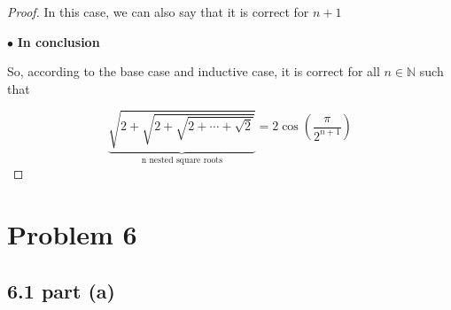 \documentclass[12pt]{article}
\begin{document}
\begin{proof}
    \vspace*{0.3cm}
    \hspace*{1.2cm}
    In this case, we can also say that it is correct for $n+1$

    \vspace*{0.3cm}
    $\bullet$ \textbf{In conclusion}

    \vspace*{0.3cm}
    \hspace*{1.2cm}
    So, according to the base case and inductive case, it is correct for all $n \in \mathbb{N}$ such that

    \[ \underbrace{\sqrt{2+\sqrt{2+\sqrt{2+\cdots + \sqrt{2}}}} }
    _\text{n nested square roots} = 2\cos
    \left(  \frac{\pi}{2^{n+1}}  \right) \]

\end{proof}

\newpage

\section*{Problem 6 }

\subsection*{6.1 part (a) }
\end{document}
